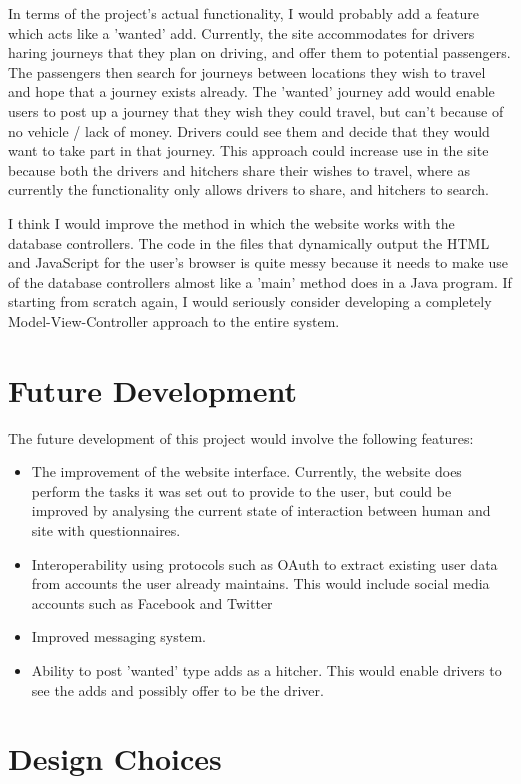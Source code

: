 In terms of the project's actual functionality, I would probably add a feature which acts like a 'wanted' add. Currently, the site accommodates for drivers haring journeys that they plan on driving, and offer them to potential passengers. The passengers then search for journeys between locations they wish to travel and hope that a journey exists already. The 'wanted' journey add would enable users to post up a journey that they wish they could travel, but can't because of no vehicle / lack of money. Drivers could see them and decide that they would want to take part in that journey. This approach could increase use in the site because both the drivers and hitchers share their wishes to travel, where as currently the functionality only allows drivers to share, and hitchers to search.

I think I would improve the method in which the website works with the database controllers. The code in the files that dynamically output the HTML and JavaScript for the user's browser is quite messy because it needs to make use of the database controllers almost like a 'main' method does in a Java program. If starting from scratch again, I would seriously consider developing a completely Model-View-Controller approach to the entire system.

\section{Future Development}
The future development of this project would involve the following features:

\begin{itemize}
\item The improvement of the website interface. Currently, the website does perform the tasks it was set out to provide to the user, but could be improved by analysing the current state of interaction between human and site with questionnaires.
\item Interoperability using protocols such as OAuth to extract existing user data from accounts the user already maintains. This would include social media accounts such as Facebook\cite{facebook} and Twitter\cite{twitter}
\item Improved messaging system.
\item Ability to post 'wanted' type adds as a hitcher. This would enable drivers to see the adds and possibly offer to be the driver.
\end{itemize}

\section{Design Choices}
